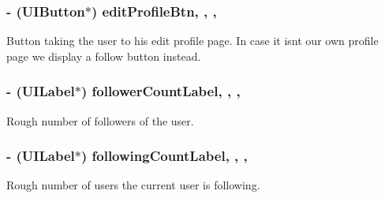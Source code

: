 \subsubsection[{edit\+Profile\+Btn}]{\setlength{\rightskip}{0pt plus 5cm}-\/ (U\+I\+Button$\ast$) edit\+Profile\+Btn\hspace{0.3cm}{\ttfamily [read]}, {\ttfamily [write]}, {\ttfamily [nonatomic]}, {\ttfamily [strong]}}\label{interface_e_s_account_view_controller_a13a66b4aca214fc9fc84c5543a84c725}
Button taking the user to his edit profile page. In case it isn\textquotesingle{}t our own profile page we display a follow button instead. \hypertarget{interface_e_s_account_view_controller_a0590250432e7b3f86b75b16acd20f3d9}{}
\subsubsection[{follower\+Count\+Label}]{\setlength{\rightskip}{0pt plus 5cm}-\/ (U\+I\+Label$\ast$) follower\+Count\+Label\hspace{0.3cm}{\ttfamily [read]}, {\ttfamily [write]}, {\ttfamily [nonatomic]}, {\ttfamily [strong]}}\label{interface_e_s_account_view_controller_a0590250432e7b3f86b75b16acd20f3d9}
Rough number of followers of the user. \hypertarget{interface_e_s_account_view_controller_a8b207ff2e2ff1dd28d9524e9ef1c8283}{}
\subsubsection[{following\+Count\+Label}]{\setlength{\rightskip}{0pt plus 5cm}-\/ (U\+I\+Label$\ast$) following\+Count\+Label\hspace{0.3cm}{\ttfamily [read]}, {\ttfamily [write]}, {\ttfamily [nonatomic]}, {\ttfamily [strong]}}\label{interface_e_s_account_view_controller_a8b207ff2e2ff1dd28d9524e9ef1c8283}
Rough number of users the current user is following. \hypertarget{interface_e_s_account_view_controller_acada7b03b8f32038376047f77f3e5896}{}
